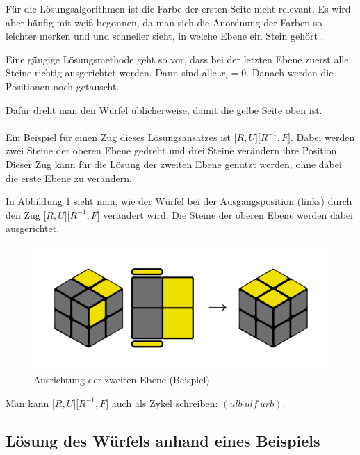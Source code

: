 \documentclass[12pt,a4paper, usenames, dvipsnames]{article}
\begin{document}
Für die Lösungsalgorithmen ist die Farbe der ersten Seite nicht relevant. Es wird aber häufig mit weiß begonnen, da man sich die Anordnung der Farben so leichter merken und und schneller sieht, in welche Ebene ein Stein gehört \cite{RF}. 

Eine gängige Lösungsmethode geht so vor, dass bei der letzten Ebene zuerst alle Steine richtig ausgerichtet werden. Dann sind alle $x_i=0$. Danach werden die Positionen noch getauscht. 

Dafür dreht man den Würfel üblicherweise, damit die gelbe Seite oben ist. \\
\\
Ein Beispiel für einen Zug dieses Lösungsansatzes ist $\lbrack R, U \rbrack \lbrack R^{-1}, F \rbrack$. Dabei werden zwei Steine der oberen Ebene gedreht und drei Steine verändern ihre Position. Dieser Zug kann für die Lösung der zweiten Ebene genutzt werden, ohne dabei die erste Ebene zu verändern. \cite{RF2} 

In Abbildung \ref{25} sieht man, wie der Würfel bei der Ausgangsposition (links) durch den Zug $\lbrack R, U \rbrack \lbrack R^{-1}, F \rbrack$ verändert wird. Die Steine der oberen Ebene werden dabei ausgerichtet.

\begin{figure}[h]
\centering
\includegraphics[scale=0.12]{isiakanm.png}
\caption{Ausrichtung der zweiten Ebene (Beispiel)}
\label{25}
\end{figure}

Man kann $\lbrack R, U \rbrack \lbrack R^{-1}, F \rbrack$ auch als Zykel schreiben: $(ulb \ ulf \ urb)$. 
%
%
%
%
%
%
%
%
%
%
%
%
%
%
%
%
%
%
%
%
\subsection*{Lösung des Würfels anhand eines Beispiels}
\end{document}

